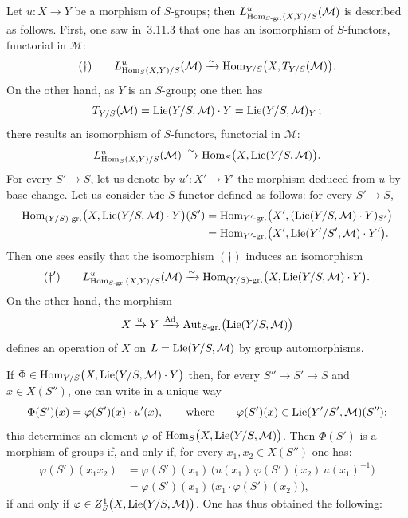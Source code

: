 \label{II.4.2}
Let \(u\colon X\to Y\) be a morphism of \(S\)-groups; then
\(L^{u}_{\operatorname{Hom}_{S\text{-gr.}}(X,Y)/S}(\mathcal{M})\) is described as follows.
First, one saw in~3.11.3 that one has an isomorphism of \(S\)-functors,
functorial in \(\mathcal{M}\):
\[
(\dagger)\qquad
L^{u}_{\operatorname{Hom}_{S}(X,Y)/S}(\mathcal{M})
\xrightarrow{\sim}
\operatorname{Hom}_{Y/S}\bigl(X,T_{Y/S}(\mathcal{M})\bigr).
\]
On the other hand, as \(Y\) is an \(S\)-group; one then has
\[
T_{Y/S}(\mathcal{M})
=
\operatorname{Lie}(Y/S,\mathcal{M})\cdot Y
=
\operatorname{Lie}(Y/S,\mathcal{M})_{Y}\,;
\]
there results an isomorphism of \(S\)-functors, functorial in \(\mathcal{M}\):
\[
L^{u}_{\operatorname{Hom}_{S}(X,Y)/S}(\mathcal{M})
\xrightarrow{\sim}
\operatorname{Hom}_{S}\bigl(X,\operatorname{Lie}(Y/S,\mathcal{M})\bigr).
\]
For every \(S'\to S\), let us denote by \(u'\colon X'\to Y'\) the morphism
deduced from \(u\) by base change. Let us consider the \(S\)-functor defined
as follows:
{\renewcommand{\thefootnote}{(57)}}
for every \(S'\to S\),
\begin{align*}
\operatorname{Hom}_{(Y/S)\text{-gr.}}\bigl(X,\operatorname{Lie}(Y/S,\mathcal{M})\cdot Y\bigr)(S')
&=
\operatorname{Hom}_{Y'\text{-gr.}}\bigl(X',(\operatorname{Lie}(Y/S,\mathcal{M})\cdot Y)_{S'}\bigr)\\
&=
\operatorname{Hom}_{Y'\text{-gr.}}\bigl(X',\operatorname{Lie}(Y'/S',\mathcal{M})\cdot Y'\bigr).
\end{align*}
Then one sees easily that the isomorphism \((\dagger)\) induces an
isomorphism
\[
(\dagger')\qquad
L^{u}_{\operatorname{Hom}_{S\text{-gr.}}(X,Y)/S}(\mathcal{M})
\xrightarrow{\sim}
\operatorname{Hom}_{(Y/S)\text{-gr.}}\bigl(X,\operatorname{Lie}(Y/S,\mathcal{M})\cdot Y\bigr).
\]
On the other hand, the morphism
\[
X\xrightarrow{u}Y\xrightarrow{\operatorname{Ad}}
\operatorname{Aut}_{S\text{-gr.}}\bigl(\operatorname{Lie}(Y/S,\mathcal{M})\bigr)
\]
defines an operation of \(X\) on \(L=\operatorname{Lie}(Y/S,\mathcal{M})\) by group
automorphisms.

If \(\Phi\in\operatorname{Hom}_{Y/S}\bigl(X,\operatorname{Lie}(Y/S,\mathcal{M})\cdot Y\bigr)\) then, for
every \(S''\to S'\to S\) and \(x\in X(S'')\), one can write in a unique way
\[
\Phi(S')(x)=\varphi(S')(x)\cdot u'(x),
\qquad\text{where}\qquad
\varphi(S')(x)\in\operatorname{Lie}(Y'/S',\mathcal{M})(S'');
\]
this determines an element \(\varphi\) of
\(\operatorname{Hom}_{S}\bigl(X,\operatorname{Lie}(Y/S,\mathcal{M})\bigr)\). Then \(\Phi(S')\) is a
morphism of groups if, and only if, for every \(x_{1},x_{2}\in X(S'')\) one
has:
\begin{align*}
\varphi(S')(x_{1}x_{2})
&=
\varphi(S')(x_{1})\,
\bigl(u(x_{1})\,\varphi(S')(x_{2})\,u(x_{1})^{-1}\bigr)\\
&=
\varphi(S')(x_{1})\,\bigl(x_{1}\cdot\varphi(S')(x_{2})\bigr),
\end{align*}
\ie if and only if \(\varphi\in Z^{1}_{S}\bigl(X,\operatorname{Lie}(Y/S,\mathcal{M})\bigr)\).
One has thus obtained the following:

